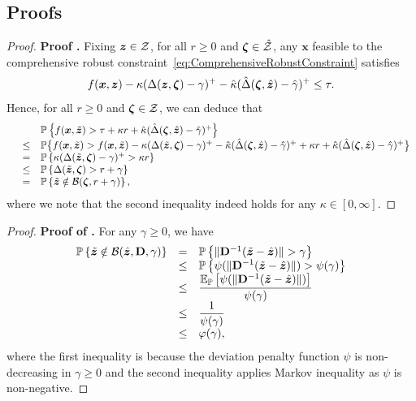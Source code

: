 \documentclass[opre, nonblindrev]{informswp}
\newcommand{\1}[1]{\mathds{1}{\left(#1\right)}}
\begin{document}
\newpage
\begin{appendices}

\section{Proofs}

\begin{proof}{\bf Proof .}
Fixing $\bm z \in \mathcal{Z}$, for all $r \geq 0$ and $\bm \zeta  \in \hat {\mathcal{Z}}$, any $\bm x$ feasible to the comprehensive robust constraint~\eqref{eq:ComprehensiveRobustConstraint} satisfies
\[
f(\bm x,\bm z) - \kappa (\Delta(\bm z,\bm \zeta) - \gamma)^+ - \hat \kappa (\hat \Delta(\bm \zeta,\hat{\bm{z}}) - \hat \gamma)^+ \leq \tau.
\]
Hence, for all $r \geq 0$ and $\bm \zeta  \in \mathcal{Z}$, we can deduce that
$$
\begin{array}{rcl}
&& \mathbb{P}\left\{f(\bm{x},\tilde{\bm{z}}) > \tau + \kappa r + \hat \kappa (\hat \Delta(\bm \zeta,\hat{\bm{z}}) - \hat \gamma)^+\right\}\\
&\leq&  \mathbb{P}\big\{f(\bm{x},\tilde{\bm{z}}) >  f(\bm{x}, \tilde{\bm{z}}) - \kappa( \Delta(\tilde{\bm{z}},\bm \zeta) - \gamma)^+ - \hat\kappa(\hat \Delta(\bm \zeta,\hat{\bm{z}}) - \hat \gamma)^+  + \kappa r + \hat \kappa (\hat \Delta(\bm \zeta,\hat{\bm{z}}) - \hat \gamma)^+\big\}\\
& =& \mathbb{P}\left\{\kappa( \Delta(\tilde{\bm{z}},\bm \zeta) - \gamma)^+ > \kappa r\right\} \\
&\leq & \mathbb{P}\left\{\Delta(\tilde{\bm{z}},\bm \zeta) > r+\gamma\right\}\\
&=& \mathbb{P}\left\{\tilde{\bm{z}} \notin \mathcal{B}(\bm \zeta,r+\gamma)\right\}, 
\end{array}
$$
where we note that the second inequality indeed holds for any $\kappa \in [0,\infty]$.
\hfill \Halmos
\end{proof}
\vspace{3mm}

\begin{proof}{\bf Proof of .}
For any $\gamma \geq 0$, we have
\[
\begin{array}{rcl}
\mathbb{P}\left\{\tilde{\bm{z}} \notin \mathcal{B}(\hat{\bm{z}}, {\mathbf{D}}, \gamma)\right\} & = & \mathbb{P}\left\{ \|{\mathbf{D}}^{-1} (\tilde{\bm{z}} - \hat{\bm{z}}) \| >\gamma\right\} \\
& \leq & \displaystyle \mathbb{P}\left\{\psi(\|{\mathbf{D}}^{-1} (\tilde{\bm{z}} - \hat{\bm{z}}) \|) > \psi(\gamma)\right\} \\
& \leq & \displaystyle \frac{\mathbb{E}_{\mathbb{P}}\left[\psi(\|{\mathbf{D}}^{-1} (\tilde{\bm{z}} - \hat{\bm{z}})\|)\right]}{\psi(\gamma)} \\
& \leq & \displaystyle \dfrac{1}{\psi(\gamma)} \\
& \leq & \varphi(\gamma),
\end{array}
\]
where the first inequality is because the deviation penalty function $\psi$ is non-decreasing in $\gamma \geq 0$ and the second inequality applies Markov inequality as $\psi$ is non-negative. 
\hfill \Halmos
\end{proof}
\vspace{3mm}


\end{appendices}
\end{document}
